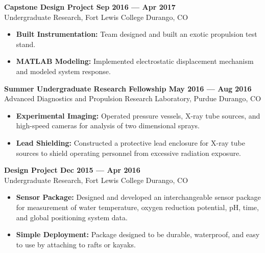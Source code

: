 \noindent \textbf{Capstone Design Project \hfill Sep 2016 --- Apr 2017}\\
Undergraduate Research, Fort Lewis College \dotfill Durango, CO

\begin{itemize}
    \item \textbf{Built Instrumentation:} Team designed and built an exotic propulsion test stand.
    \item \textbf{MATLAB Modeling:} Implemented electrostatic displacement mechanism and modeled system response.
\end{itemize}

\noindent \textbf{Summer Undergraduate Research Fellowship \hfill May 2016 --- Aug 2016}\\
Advanced Diagnostics and Propulsion Research Laboratory, Purdue \dotfill Durango, CO

\begin{itemize}
    \item \textbf{Experimental Imaging:} Operated pressure vessels, X-ray tube sources, and high-speed cameras for analysis of two dimensional sprays.
    \item \textbf{Lead Shielding:} Constructed a protective lead enclosure for X-ray tube sources to shield operating personnel from excessive radiation exposure.
\end{itemize}

\noindent \textbf{Design Project \hfill Dec 2015 --- Apr 2016}\\
Undergraduate Research, Fort Lewis College \dotfill Durango, CO

\begin{itemize}
    \item \textbf{Sensor Package:} Designed and developed an interchangeable sensor package for measurement of water temperature, oxygen reduction potential, pH, time, and global positioning system data.
    \item \textbf{Simple Deployment:} Package designed to be durable, waterproof, and easy to use by attaching to rafts or kayaks.
\end{itemize}
